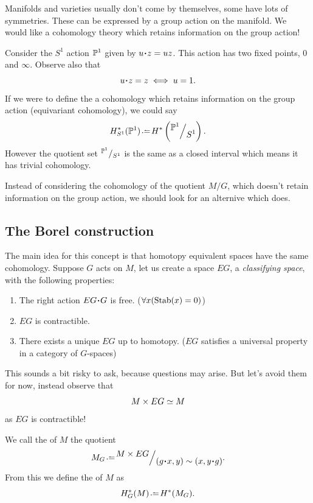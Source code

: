 \documentclass[12pt]{memoir}
\begin{document}
Manifolds and varieties usually don't come by themselves, some have lots of symmetries. These can be expressed by a group action on the manifold. We would like a cohomology theory which retains information on the group action!

\begin{Ex}
    Consider the $S^1$ action $\mathbb{P}^1$ given by $u\. z=uz$. This action has two fixed points, $0$ and $\infty$. Observe also that 
    $$u\.z=z\iff u=1.$$
    If we were to define the a cohomology which retains information on the group action (equivariant cohomology), we could say 
    $$H_{S^1}^\ast(\bP^1)\defeq H^\ast\left(\quot{\bP^1}{S^1}\right).$$
    However the quotient set $\quot{\bP^1}{S^1}$ is the same as a closed interval which means it has trivial cohomology.
\end{Ex}

Instead of considering the cohomology of the quotient $M/G$, which doesn't retain information on the group action, we should look for an alternive which does.

\subsection{The Borel construction}

The main idea for this concept is that homotopy equivalent spaces have the same cohomology. Suppose $G$ acts on $M$, let us create a space $EG$, a \emph{classifying space}, with the following properties:

\begin{enumerate}
    \item The right action $EG\. G$ is free. ($\forall x(\operatorname{Stab}(x)=0)$)
    \item $EG$ is contractible. 
    \item There exists a unique $EG$ up to homotopy. ($EG$ satisfies a universal property in a category of $G$-spaces)
\end{enumerate}

This sounds a bit risky to ask, because questions may arise. But let's avoid them for now, instead observe that 
$$M\times EG\simeq M$$
as $EG$ is contractible! 

\begin{Def}
    We call the  of $M$ the quotient
    $$M_G\defeq\quot{M\x EG}{(g\.x,y)\sim(x,y\.g)}.$$
    From this we define the  of $M$ as 
    $$H_G^\ast(M)\defeq H^\ast(M_G).$$
\end{Def}
\end{document}
